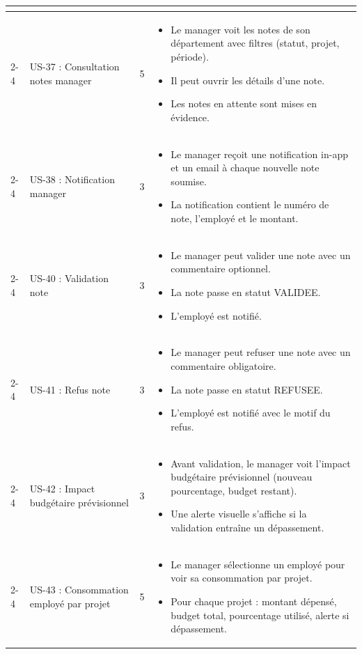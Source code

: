 \documentclass[12pt,a4paper]{report}
\begin{document}
\begin{longtable}{|p{2.5cm}|p{3cm}|p{1.5cm}|p{8cm}|}
\begin{itemize}
\end{itemize} \\
\cline{2-4}
& US-37 : Consultation notes manager & 5 & \begin{itemize}
 \item Le manager voit les notes de son département avec filtres (statut, projet, période).
 \item Il peut ouvrir les détails d’une note.
 \item Les notes en attente sont mises en évidence.
\end{itemize} \\
\cline{2-4}
& US-38 : Notification manager & 3 & \begin{itemize}
 \item Le manager reçoit une notification in-app et un email à chaque nouvelle note soumise.
 \item La notification contient le numéro de note, l’employé et le montant.
\end{itemize} \\
\cline{2-4}
& US-40 : Validation note & 3 & \begin{itemize}
 \item Le manager peut valider une note avec un commentaire optionnel.
 \item La note passe en statut VALIDEE.
 \item L’employé est notifié.
\end{itemize} \\
\cline{2-4}
& US-41 : Refus note & 3 & \begin{itemize}
 \item Le manager peut refuser une note avec un commentaire obligatoire.
 \item La note passe en statut REFUSEE.
 \item L’employé est notifié avec le motif du refus.
\end{itemize} \\
\cline{2-4}
& US-42 : Impact budgétaire prévisionnel & 3 & \begin{itemize}
 \item Avant validation, le manager voit l’impact budgétaire prévisionnel (nouveau pourcentage, budget restant).
 \item Une alerte visuelle s’affiche si la validation entraîne un dépassement.
\end{itemize} \\
\cline{2-4}
& US-43 : Consommation employé par projet & 5 & \begin{itemize}
 \item Le manager sélectionne un employé pour voir sa consommation par projet.
 \item Pour chaque projet : montant dépensé, budget total, pourcentage utilisé, alerte si dépassement.
\end{itemize} \\
\hline


\end{longtable}
\end{document}
